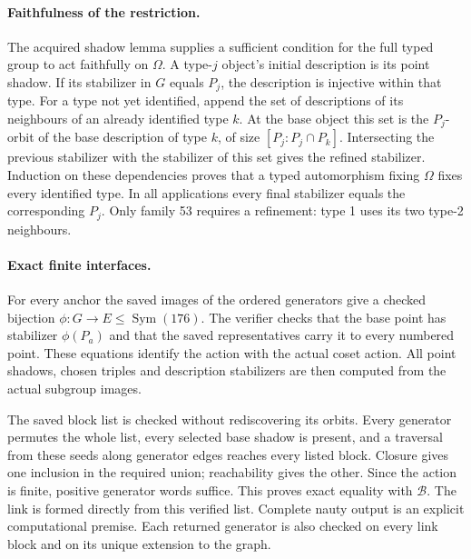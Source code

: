 \documentclass[11pt]{article}
\begin{document}
\paragraph{Faithfulness of the restriction.}
The acquired shadow lemma supplies a sufficient condition for the full
typed group to act faithfully on $\Omega$. A type-$j$ object's initial
description is its point shadow. If its stabilizer in $G$ equals $P_j$,
the description is injective within that type. For a type not yet identified,
append the set of descriptions of its neighbours of an already identified
type $k$. At the base object this set is the $P_j$-orbit of the base
description of type $k$, of size $[P_j:P_j\cap P_k]$.
Intersecting the previous stabilizer with the stabilizer of this set gives
the refined stabilizer. Induction on these dependencies proves that a
typed automorphism fixing $\Omega$ fixes every identified type.
In all applications every final stabilizer equals the corresponding $P_j$.
Only family 53 requires a refinement: type 1 uses its two type-2 neighbours.

\paragraph{Exact finite interfaces.}
For every anchor the saved images of the ordered generators give a checked
bijection $\phi:G\longrightarrow E\leq\operatorname{Sym}(176)$.
The verifier checks that the base point has stabilizer $\phi(P_a)$ and
that the saved representatives carry it to every numbered point.
These equations identify the action with the actual coset action.
All point shadows, chosen triples and description stabilizers are then
computed from the actual subgroup images.

The saved block list is checked without rediscovering its orbits.
Every generator permutes the whole list, every selected base shadow is
present, and a traversal from these seeds along generator edges reaches
every listed block. Closure gives one inclusion in the required union;
reachability gives the other. Since the action is finite, positive generator
words suffice. This proves exact equality with $\mathcal B$.
The link is formed directly from this verified list. Complete nauty output
is an explicit computational premise. Each returned generator is also
checked on every link block and on its unique extension to the graph.
\end{document}
